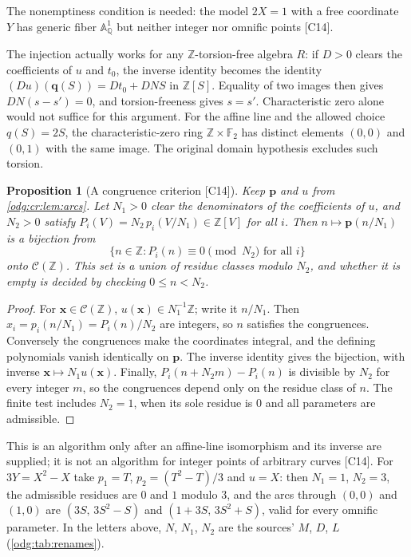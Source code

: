 \documentclass[11pt,oneside]{article}
\numberwithin{equation}{section}
\newtheorem{proposition}[proposition]{Proposition}
\theoremstyle{definition}
\theoremstyle{remark}
\newcommand{\Z}{\mathbb Z}
\newcommand{\Q}{\mathbb Q}
\newcommand{\src}[1]{\textup{\textsf{\small[#1]}}}
\newcommand{\Aff}{\mathbb A}
\begin{document}
The nonemptiness condition is needed: the model $2X=1$ with a free coordinate $Y$
has generic fiber $\Aff^1_\Q$ but neither integer nor omnific points \src{C14}.

The injection actually works for any $\Z$-torsion-free algebra $R$: if $D>0$
clears the coefficients of $u$ and $t_0$, the inverse identity becomes the
identity $(Du)(\mathbf q(S))=Dt_0+DN S$ in $\Z[S]$. Equality of two images
then gives $DN(s-s')=0$, and torsion-freeness gives $s=s'$. Characteristic
zero alone would not suffice for this argument. For the affine line and
the allowed choice $q(S)=2S$, the characteristic-zero ring
$\Z\times\mathbb F_2$ has distinct elements $(0,0)$ and $(0,1)$ with the
same image. The original domain hypothesis excludes such torsion.

\begin{proposition}[A congruence criterion \src{C14}]\label{odg:cr:prop:congruence}
Keep $\mathbf p$ and $u$ from \cref{odg:cr:lem:arcs}. Let $N_1>0$ clear the
denominators of the coefficients of $u$, and $N_2>0$ satisfy
$P_i(V)=N_2\,p_i(V/N_1)\in\Z[V]$ for all $i$. Then $n\mapsto\mathbf p(n/N_1)$ is a
bijection from
\[
 \{n\in\Z:P_i(n)\equiv0\pmod{N_2}\text{ for all }i\}
\]
onto $\mathcal C(\Z)$. This set is a union of residue classes modulo $N_2$, and
whether it is empty is decided by checking $0\le n<N_2$.
\end{proposition}
\begin{proof}
For $\mathbf x\in\mathcal C(\Z)$, $u(\mathbf x)\in N_1^{-1}\Z$; write it $n/N_1$. Then
$x_i=p_i(n/N_1)=P_i(n)/N_2$ are integers, so $n$ satisfies the congruences.
Conversely the congruences make the coordinates integral, and the defining
polynomials vanish identically on $\mathbf p$. The inverse identity gives the
bijection, with inverse $\mathbf x\mapsto N_1u(\mathbf x)$. Finally,
$P_i(n+N_2m)-P_i(n)$ is divisible by $N_2$ for every integer $m$, so the
congruences depend only on the residue class of $n$. The finite test includes
$N_2=1$, when its sole residue is $0$ and all parameters are admissible.
\end{proof}

This is an algorithm only after an affine-line isomorphism and its inverse are
supplied; it is not an algorithm for integer points of arbitrary curves
\src{C14}. For $3Y=X^2-X$ take $p_1=T$, $p_2=(T^2-T)/3$ and $u=X$: then $N_1=1$,
$N_2=3$, the admissible residues are $0$ and $1$ modulo $3$, and the arcs through
$(0,0)$ and $(1,0)$ are $(3S,\,3S^2-S)$ and $(1+3S,\,3S^2+S)$, valid for every
omnific parameter. In the letters above, $N$, $N_1$, $N_2$ are the sources' $M$,
$D$, $L$ (\cref{odg:tab:renames}).
\end{document}
